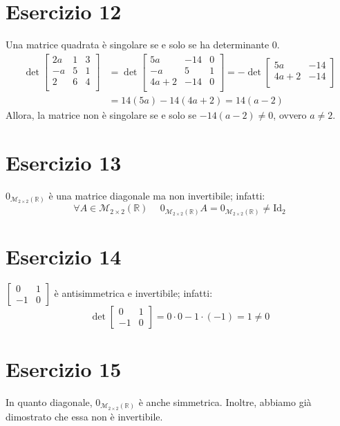 \documentclass{article}
\newcommand*{\M}[3]{\mathcal{M}_{#1\times#2} \left(#3\right)}
\newcommand*{\MR}[2]{\M{#1}{#2}{\mathbb{R}}}
\begin{document}
\section*{Esercizio 12}
Una matrice quadrata è singolare se e solo se ha determinante $0$.
\[\begin{aligned}
    \det\begin{bmatrix}
        2a & 1 & 3 \\
        -a & 5 & 1 \\
        2 & 6 & 4 \\
    \end{bmatrix} &= \det\begin{bmatrix}
        5a & -14 & 0 \\
        -a & 5 & 1 \\
        4a+2 & -14 & 0 \\
    \end{bmatrix} = -\det\begin{bmatrix}
        5a & -14 \\
        4a+2 & -14 \\
    \end{bmatrix} \\ &= 14(5a) - 14(4a+2) = 14(a-2)
\end{aligned}\]
Allora, la matrice non è singolare se e solo se $-14(a-2) \ne 0$, ovvero $a \ne 2$.

\section*{Esercizio 13}
$0_{\MR{2}{2}}$ è una matrice diagonale ma non invertibile; infatti:
\[\forall A\in\MR{2}{2}\hspace{15pt}0_{\MR{2}{2}}A=0_{\MR{2}{2}}\ne\text{Id}_2\]

\section*{Esercizio 14}
$\begin{bmatrix} 0 & 1 \\ -1 & 0 \end{bmatrix}$ è antisimmetrica e invertibile; infatti:
\[
    \det\begin{bmatrix} 0 & 1 \\ -1 & 0 \end{bmatrix} =
    0\cdot0 - 1\cdot(-1) = 1 \ne 0
\]

\section*{Esercizio 15}
In quanto diagonale, $0_{\MR{2}{2}}$ è anche simmetrica.
Inoltre, abbiamo già dimostrato che essa non è invertibile.
\end{document}
